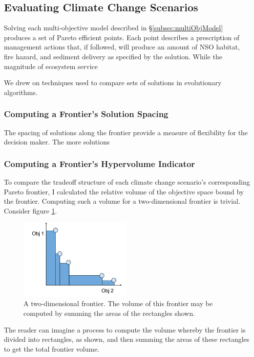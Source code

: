 \subsection{Evaluating Climate Change Scenarios}
Solving each multi-objective model described in \S \ref{subsec:multiObjModel} produces a set of Pareto efficient points. Each point describes a prescription of management actions that, if followed, will produce an amount of NSO habitat, fire hazard, and sediment delivery as specified by the solution. While the magnitude of ecosystem service 

We drew on techniques used to compare sets of solutions in evolutionary algorithms.

\subsubsection{Computing a Frontier's Solution Spacing}
The spacing of solutions along the frontier provide a measure of flexibility for the decision maker. The more solutions 

\subsubsection{Computing a Frontier's Hypervolume Indicator}
To compare the tradeoff structure of each climate change scenario's corresponding Pareto frontier, I calculated the relative volume of the objective space bound by the frontier.  Computing such a volume for a two-dimensional frontier is trivial. Consider figure \ref{fig:2DFrontierVol}.
\begin{figure}[h]
  \centering
    \includegraphics[width=0.5\textwidth]{"../images/2DFrontierVolumeExample"}
  \caption{A two-dimensional frontier. The volume of this frontier may be computed by summing the areas of the rectangles shown.}
  \label{fig:2DFrontierVol}
\end{figure}
The reader can imagine a process to compute the volume whereby the frontier is divided into rectangles, as shown, and then summing the areas of these rectangles to get the total frontier volume.

